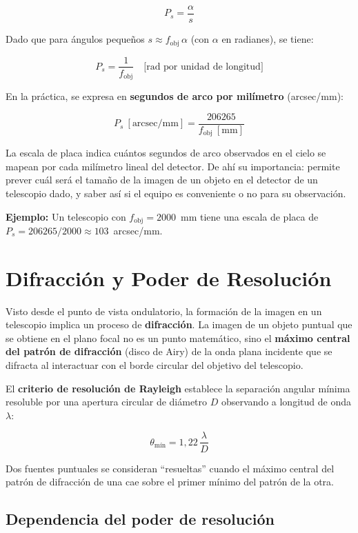 $$P_s = \frac{\alpha}{s}$$

Dado que para ángulos pequeños $s \approx f_{\text{obj}}\,\alpha$ (con $\alpha$ en radianes), se tiene:

$$P_s = \frac{1}{f_{\text{obj}}} \quad \text{[rad por unidad de longitud]}$$

En la práctica, se expresa en \textbf{segundos de arco por milímetro} (arcsec/mm):

$$P_s~[\text{arcsec/mm}] = \frac{206265}{f_{\text{obj}}~[\text{mm}]}$$

La escala de placa indica cuántos segundos de arco observados en el cielo se mapean por cada milímetro lineal del detector. De ahí su importancia: permite prever cuál será el tamaño de la imagen de un objeto en el detector de un telescopio dado, y saber así si el equipo es conveniente o no para su observación.

\textbf{Ejemplo:} Un telescopio con $f_{\text{obj}} = 2000$~mm tiene una escala de placa de $P_s = 206265/2000 \approx 103$~arcsec/mm.

\section{Difracción y Poder de Resolución}

Visto desde el punto de vista ondulatorio, la formación de la imagen en un telescopio implica un proceso de \textbf{difracción}. La imagen de un objeto puntual que se obtiene en el plano focal no es un punto matemático, sino el \textbf{máximo central del patrón de difracción} (disco de Airy) de la onda plana incidente que se difracta al interactuar con el borde circular del objetivo del telescopio.



El \textbf{criterio de resolución de Rayleigh} establece la separación angular mínima resoluble por una apertura circular de diámetro $D$ observando a longitud de onda $\lambda$:

$$\theta_{\text{mín}} = 1{,}22\,\frac{\lambda}{D}$$

Dos fuentes puntuales se consideran ``resueltas'' cuando el máximo central del patrón de difracción de una cae sobre el primer mínimo del patrón de la otra.



\subsection{Dependencia del poder de resolución}


